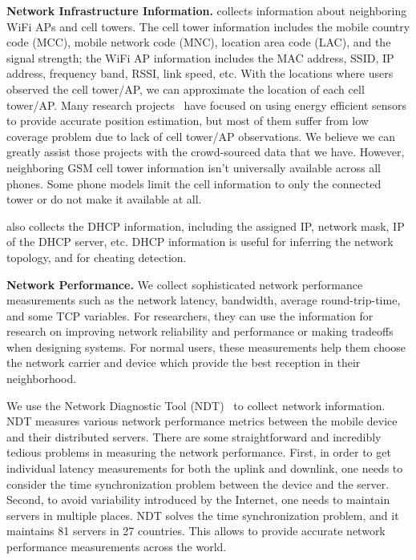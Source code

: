 {\bfseries Network Infrastructure Information.} \name{} collects information about
neighboring WiFi APs and cell towers. The cell tower information includes the mobile country code (MCC),
mobile network code (MNC), location area code (LAC), and the signal strength; the WiFi AP information
includes the MAC address, SSID, IP address, frequency band, RSSI, link speed, etc.
With the locations where users observed the cell tower/AP, we can approximate the location of
each cell tower/AP. Many research projects~\cite{ctrack, vtrack-sensys09} have focused on using
energy efficient sensors to provide accurate position estimation, but most of them suffer from
low coverage problem due to lack of cell tower/AP observations. We believe we can greatly assist those projects
with the crowd-sourced data that we have. However, neighboring GSM cell tower information isn't
universally available across all phones. Some phone models limit the cell information to only
the connected tower or do not make it available at all.

\name{} also collects the DHCP information, including the assigned IP, network mask, IP of the DHCP server, etc.
DHCP information is useful for inferring the network topology, and for cheating detection.


{\bfseries Network Performance.} We collect sophisticated network performance measurements
such as the network latency, bandwidth, average round-trip-time, and some TCP variables.
For researchers, they can use the information for research on improving network reliability and performance or
 making tradeoffs when designing systems.
For normal users, these measurements help them choose the network carrier and device which provide
 the best reception in their neighborhood.

We use the Network Diagnostic Tool (NDT)~\cite{NDT} to collect network information. NDT measures various network
performance metrics between the mobile device and their distributed servers. There are some straightforward
and incredibly tedious problems in measuring the network performance. First, in order to get individual latency
measurements for both the uplink and downlink, one needs to consider the time
synchronization problem between the device and the server. Second, to avoid variability introduced by the Internet,
one needs to maintain servers in multiple places.
NDT solves the time synchronization problem, and it maintains 81 servers in 27 countries. This allows \name{}
to provide accurate network performance measurements across the world.

